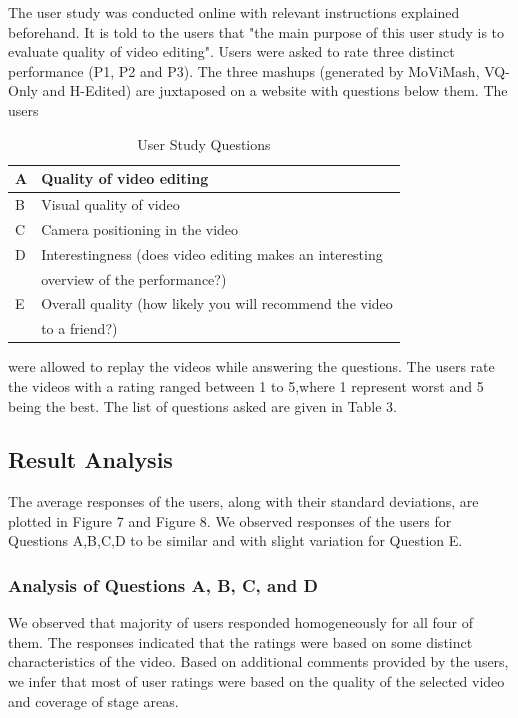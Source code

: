 \documentclass{sig-alternate}
\begin{document}
 The user study was conducted online with relevant instructions explained beforehand. It is told to the users that "the main purpose of this user study is to evaluate quality of video editing". Users were asked to rate three distinct performance (P1, P2 and P3). The three mashups (generated by MoViMash, VQ-Only and H-Edited) are juxtaposed on a website with questions below them. The users 
 \begin{table}
\centering
\caption{ User Study Questions }
\begin{tabular}{p{0.3cm}|p{8cm}} \hline
A& Quality of video editing\\ \hline
B&Visual quality of video\\ \hline
C& Camera positioning in the video\\ \hline
D& Interestingness (does video editing makes an interesting\\ 
& overview of the performance?)\\ \hline
E &Overall quality (how likely you will recommend the video \\
& to a friend?)\\ \hline
\end{tabular}
\end{table}
 were allowed to replay the videos while answering the questions. The users rate the videos with a rating ranged between 1 to 5,where 1 represent worst and 5 being the best. The list of questions asked are given in Table 3. 

\subsection{Result Analysis}

The average responses of the users, along with their standard deviations, are plotted in Figure 7 and Figure 8. We observed responses of the users for Questions A,B,C,D to be similar and with slight variation for Question E.

\subsubsection{ Analysis of Questions A, B, C, and D }
We observed that majority of users responded homogeneously for all four of them. The responses indicated that the ratings were based on some distinct characteristics of the video. Based on additional comments provided by the users, we infer that most of user ratings were based on the quality of the selected video and coverage of stage areas.
\end{document}

